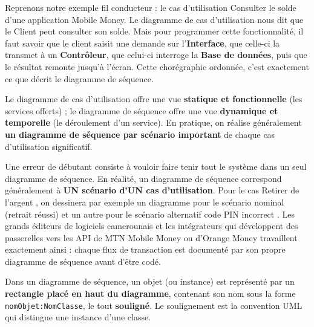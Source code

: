 \documentclass[11pt]{article}
\newcommand{\cle}[1]{{\popxbold\color{popdark}#1}}
\newcounter{popsec}
\newcounter{popsub}
\newcommand{\courssub}[1]{%
  \stepcounter{popsub}%
  \par\vspace{9pt}\noindent{\popxbold\fontsize{11.5}{13}\selectfont\color{popink}{\color{poporange}\thepopsec.\thepopsub}\hspace{6pt}#1}\par\nopagebreak\vspace{4pt}
}
\begin{document}
Reprenons notre exemple fil conducteur : le cas d'utilisation \og Consulter le solde \fg{} d'une application Mobile Money. Le diagramme de cas d'utilisation nous dit que le \cle{Client} peut consulter son solde. Mais pour programmer cette fonctionnalité, il faut savoir que le client saisit une demande sur l'\textbf{Interface}, que celle-ci la transmet à un \textbf{Contrôleur}, que celui-ci interroge la \textbf{Base de données}, puis que le résultat remonte jusqu'à l'écran. Cette chorégraphie ordonnée, c'est exactement ce que décrit le diagramme de séquence.

\begin{propriete}
Le diagramme de cas d'utilisation offre une vue \textbf{statique et fonctionnelle} (les services offerts) ; le diagramme de séquence offre une vue \textbf{dynamique et temporelle} (le déroulement d'un service). En pratique, on réalise généralement \textbf{un diagramme de séquence par scénario important} de chaque cas d'utilisation significatif.
\end{propriete}

\begin{savaistu}[Un diagramme = un scénario, pas tout le système]
Une erreur de débutant consiste à vouloir faire tenir tout le système dans un seul diagramme de séquence. En réalité, un diagramme de séquence correspond généralement à \textbf{UN scénario d'UN cas d'utilisation}. Pour le cas \og Retirer de l'argent \fg{}, on dessinera par exemple un diagramme pour le scénario nominal (retrait réussi) et un autre pour le scénario alternatif \og code PIN incorrect \fg{}. Les grands éditeurs de logiciels camerounais et les intégrateurs qui développent des passerelles vers les API de MTN Mobile Money ou d'Orange Money travaillent exactement ainsi : chaque flux de transaction est documenté par son propre diagramme de séquence avant d'être codé.
\end{savaistu}

\courssub{L'objet (ou instance) et l'acteur}

\begin{definition}
Dans un diagramme de séquence, un \cle{objet} (ou \cle{instance}) est représenté par un \textbf{rectangle placé en haut du diagramme}, contenant son nom sous la forme \texttt{nomObjet:NomClasse}, le tout \textbf{souligné}. Le soulignement est la convention UML qui distingue une instance d'une classe.
\end{definition}
\end{document}

